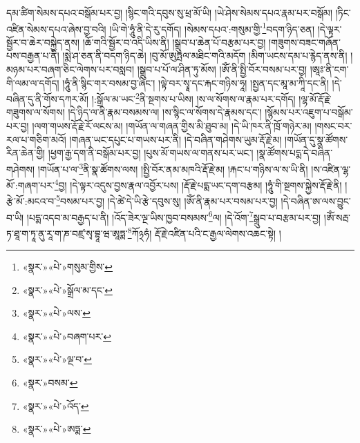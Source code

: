 དམ་ཚིག་སེམས་དཔའ་བསྒོམ་པར་བྱ། །སྙིང་གའི་དབུས་སུ་ཕྲ་མོ་ཡི། །ཡེ་ཤེས་སེམས་དཔའ་རྣམ་པར་བསྒོམ། །ཏིང་འཛིན་སེམས་དཔའ་ཞེས་བྱ་བའི། །ཡི་གེ་ཧཱུཾ་ནི་དེ་རུ་དགོད། །སེམས་དཔའ་:གསུམ་གྱི་\footnote{«སྣར་»«པེ་»གསུམ་གྱིས་}བདག་ཉིད་ཅན། །དེ་ལྟར་སྦྱོར་བ་ཆེར་བསྐྱེད་ནས། །ཆོ་གའི་སྦྱོར་བ་འདི་ཡིས་ནི། །སྒྲུབ་པ་ཆེན་པོ་བརྩམ་པར་བྱ། །གཟུགས་བཟང་གཞོན་པས་བརྒྱན་པ་ནི། །སྨེ་ཤ་ཅན་ནི་བདག་ཉིད་ཆེ། །བུ་མོ་ཨུཏྤལ་མཐིང་གའི་མདོག །མིག་ཡངས་དམ་པ་རྙེད་ནས་ནི། །མཉམ་པར་བཞག་ཅིང་ལེགས་པར་བསླབ། །སྒྲུབ་པ་པོ་ལ་ཤིན་ཏུ་མོས། །ཨོཾ་ནི་སྤྱི་བོར་བསམ་པར་བྱ། །ཨཱཿ་ནི་ངག་གི་ལམ་ལ་དགོད། །ཧཱུཾ་ནི་སྙིང་གར་བསམ་བྱ་ཞིང་། །ལྟེ་བར་སྭཱ་དང་རྐང་གཉིས་ཧཱ། །སྤྱན་དང་མཱ་མ་ཀཱི་དང་ནི། །དེ་བཞིན་དུ་ནི་གོས་དཀར་མོ། །:སྒྲོལ་མ་ཡང་\footnote{«སྣར་»«པེ་»སྒྲོལ་མ་དང་}ནི་སྔགས་པ་ཡིས། །ས་ལ་སོགས་ལ་རྣམ་པར་དགོད། །ལྷ་མོ་རྡོ་རྗེ་གཟུགས་ལ་སོགས། །དེ་ཉིད་ལ་ནི་རྣམ་བསམས་ལ། །ས་སྙིང་ལ་སོགས་དེ་རྣམས་དང་། །སྙོམས་པར་འཇུག་པ་བསྒོམ་པར་བྱ། །ལག་གཡས་རྡོ་རྗེ་རོ་ལངས་མ། །གཡོན་ལ་གཞན་གྱིས་མི་ཐུབ་མ། །དེ་ཡི་ཁར་ནི་ཁྲོ་གཉེར་མ། །གསང་བར་རལ་པ་གཅིག་མའོ། །གཞན་ཡང་དཔུང་པ་གཡས་པར་ནི། །དེ་བཞིན་གཤེགས་ཡུམ་རྡོ་རྗེ་མ། །གཡོན་དུ་སྣ་ཚོགས་རིན་ཆེན་གྱི། །ཕྱག་རྒྱ་དག་ནི་བསྒོམ་པར་བྱ། །པུས་མོ་གཡས་ལ་གནས་པར་ཡང་། །སྣ་ཚོགས་པདྨ་དེ་བཞིན་གཤེགས། །གཡོན་པ་ལ་\footnote{«སྣར་»«པེ་»ལས་}ནི་སྣ་ཚོགས་ལས། །སྤྱི་བོར་ནམ་མཁའི་རྡོ་རྗེ་མ། །རྐང་པ་གཉིས་ལ་ས་ཡི་ནི། །ས་འཛིན་ལྷ་མོ་:གཞག་པར་\footnote{«སྣར་»«པེ་»བཞག་པར་}བྱ། །དེ་ལྟར་འདུས་བྱས་རྣལ་འབྱོར་པས། །རྡོ་རྗེ་པདྨ་ཡང་དག་བརྩམ། །ཧཱུཾ་གི་སྔགས་སྐྱེས་རྡོ་རྗེ་ནི། །རྩེ་མོ་:མངའ་བ་\footnote{«སྣར་»«པེ་»ལྔ་བ་}བསམ་པར་བྱ། །དེ་ཚེ་དེ་ཡི་རྩེ་དབུས་སུ། །ཨོཾ་ནི་རྣམ་པར་བསམ་པར་བྱ། །དེ་བཞིན་ཨ་ལས་བྱུང་བ་ཡི། །པདྨ་འདབ་མ་བརྒྱད་པ་ནི། །འོད་ཟེར་ལྔ་ཡིས་ཁྱབ་བསམས་\footnote{«སྣར་»བསམ་}ལ། །དེ་འོག་\footnote{«སྣར་»«པེ་»འོད་}སྒྲུབ་པ་བརྩམ་པར་བྱ། །ཨོཾ་སརྦ་ཏ་ཐཱ་ག་ཏཱ་ནུ་རཱ་ག་ཎ་བཛྲ་སྭ་བྷཱ་ཝ་ཨཱཏྨ་\footnote{«སྣར་»«པེ་»ཨཏྨ་}ཀོ྅ཧཾ། རྡོ་རྗེ་འཛིན་པའི་ང་རྒྱལ་ལེགས་འཆང་སྟེ། །
